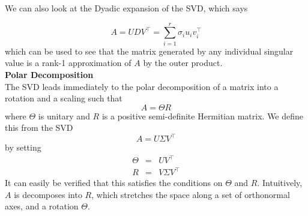 \documentclass[11pt]{article}
\begin{document}
We can also look at the Dyadic expansion of the SVD, which says

\begin{equation*} A = UDV^\intercal = \sum_{i=1}^r \sigma_iu_iv_i^\intercal \end{equation*}
which can be used to see that the matrix generated by any individual singular value is a rank-1 approximation of $A$ by the outer product.\\

{\bf Polar Decomposition}\\
The SVD leads immediately to the polar decomposition of a matrix into a rotation and a scaling such that
\begin{equation*} A = \Theta R \end{equation*} where $\Theta$ is unitary and $R$ is a positive semi-definite Hermitian matrix. We define this from the SVD
\begin{equation*} A = U\Sigma V^\intercal \end{equation*}
by setting
\begin{eqnarray*} \Theta &=& UV^\intercal \\ R &=& V \Sigma V^\intercal \end{eqnarray*}
It can easily be verified that this satisfies the conditions on $\Theta$ and $R$. Intuitively, $A$ is decomposes into $R$, which stretches the space along a set of orthonormal axes, and a rotation $\Theta$.
\end{document}
